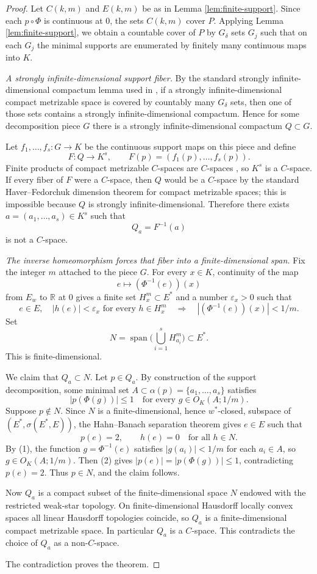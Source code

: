 \documentclass[11pt]{article}
\newcommand{\Lin}{\operatorname{span}}
\newcommand{\weakstar}{w^*}
\begin{document}
\begin{proof}
Let $C(k,m)$ and $E(k,m)$ be as in Lemma \ref{lem:finite-support}. Since
each $p\circ\Phi$ is continuous at $0$, the sets $C(k,m)$ cover $P$. Applying
Lemma \ref{lem:finite-support}, we obtain a countable cover of $P$ by
$G_\delta$ sets $G_j$ such that on each $G_j$ the minimal supports are
enumerated by finitely many continuous maps into $K$.

\smallskip
\noindent\emph{A strongly infinite-dimensional support fiber.}
By the standard strongly infinite-dimensional compactum lemma used in
\cite[Proposition 2]{KrupskiWeakPointwise}, if a strongly
infinite-dimensional compact metrizable space is covered by countably many
$G_\delta$ sets, then one of those sets contains a strongly
infinite-dimensional compactum. Hence for some decomposition piece $G$ there
is a strongly infinite-dimensional compactum $Q\subset G$.

Let $f_1,\ldots,f_s:G\to K$ be the continuous support maps on this piece and
define
\[
  F:Q\to K^s,\qquad F(p)=(f_1(p),\ldots,f_s(p)).
\]
Finite products of compact metrizable $C$-spaces are $C$-spaces
\cite{RohmProducts}, so $K^s$ is a $C$-space. If every fiber of $F$ were a
$C$-space, then $Q$ would be a $C$-space by the standard Haver--Fedorchuk
dimension theorem for compact metrizable spaces; this is impossible because
$Q$ is strongly infinite-dimensional. Therefore there exists
$a=(a_1,\ldots,a_s)\in K^s$ such that
\[
  Q_a=F^{-1}(a)
\]
is not a $C$-space.

\smallskip
\noindent\emph{The inverse homeomorphism forces that fiber into a
finite-dimensional span.}
Fix the integer $m$ attached to the piece $G$. For every $x\in K$, continuity
of the map
\[
  e\mapsto (\Phi^{-1}(e))(x)
\]
from $E_w$ to $\mathbb R$ at $0$ gives a finite set
$H_x^m\subset E^*$ and a number $\varepsilon_x>0$ such that
\[
  e\in E,\quad |h(e)|<\varepsilon_x\text{ for every }h\in H_x^m
  \quad\Longrightarrow\quad
  |(\Phi^{-1}(e))(x)|<1/m.       \tag{1}
\]
Set
\[
  N=\Lin\Big(\bigcup_{i=1}^s H_{a_i}^m\Big)\subset E^*.
\]
This is finite-dimensional.

We claim that $Q_a\subset N$. Let $p\in Q_a$. By construction of the support
decomposition, some minimal set $A\subset \alpha(p)=\{a_1,\ldots,a_s\}$
satisfies
\[
  |p(\Phi(g))|\le 1\quad\text{for every }g\in O_K(A;1/m).       \tag{2}
\]
Suppose $p\notin N$. Since $N$ is a finite-dimensional, hence
$\weakstar$-closed, subspace of $(E^*,\sigma(E^*,E))$, the Hahn--Banach
separation theorem gives $e\in E$ such that
\[
  p(e)=2,\qquad h(e)=0\quad\text{for all }h\in N.
\]
By (1), the function $g=\Phi^{-1}(e)$ satisfies $|g(a_i)|<1/m$ for each
$a_i\in A$, so $g\in O_K(A;1/m)$. Then (2) gives $|p(e)|=|p(\Phi(g))|\le 1$,
contradicting $p(e)=2$. Thus $p\in N$, and the claim follows.

Now $Q_a$ is a compact subset of the finite-dimensional space $N$ endowed
with the restricted weak-star topology. On finite-dimensional Hausdorff
locally convex spaces all linear Hausdorff topologies coincide, so $Q_a$ is a
finite-dimensional compact metrizable space. In particular $Q_a$ is a
$C$-space. This contradicts the choice of $Q_a$ as a non-$C$-space.

The contradiction proves the theorem.
\end{proof}
\end{document}
